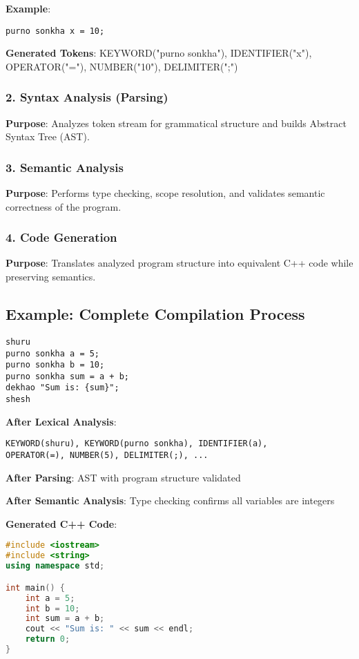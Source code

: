 \documentclass[12pt,a4paper]{article}
\begin{document}
\textbf{Example}:
\begin{lstlisting}[caption=Banglish Code Input]
purno sonkha x = 10;
\end{lstlisting}

\textbf{Generated Tokens}: KEYWORD("purno sonkha"), IDENTIFIER("x"), OPERATOR("="), NUMBER("10"), DELIMITER(";")

\subsubsection{2. Syntax Analysis (Parsing)}

\textbf{Purpose}: Analyzes token stream for grammatical structure and builds Abstract Syntax Tree (AST).

\subsubsection{3. Semantic Analysis}

\textbf{Purpose}: Performs type checking, scope resolution, and validates semantic correctness of the program.

\subsubsection{4. Code Generation}

\textbf{Purpose}: Translates analyzed program structure into equivalent C++ code while preserving semantics.

\subsection{Example: Complete Compilation Process}

\begin{lstlisting}[caption=Banglish Source Code]
shuru
purno sonkha a = 5;
purno sonkha b = 10;
purno sonkha sum = a + b;
dekhao "Sum is: {sum}";
shesh
\end{lstlisting}

\textbf{After Lexical Analysis}:
\begin{verbatim}
KEYWORD(shuru), KEYWORD(purno sonkha), IDENTIFIER(a), 
OPERATOR(=), NUMBER(5), DELIMITER(;), ...
\end{verbatim}

\textbf{After Parsing}: AST with program structure validated

\textbf{After Semantic Analysis}: Type checking confirms all variables are integers

\textbf{Generated C++ Code}:
\begin{lstlisting}[language=C++, caption=Generated C++ Output]
#include <iostream>
#include <string>
using namespace std;

int main() {
    int a = 5;
    int b = 10;
    int sum = a + b;
    cout << "Sum is: " << sum << endl;
    return 0;
}
\end{lstlisting}
\end{document}
